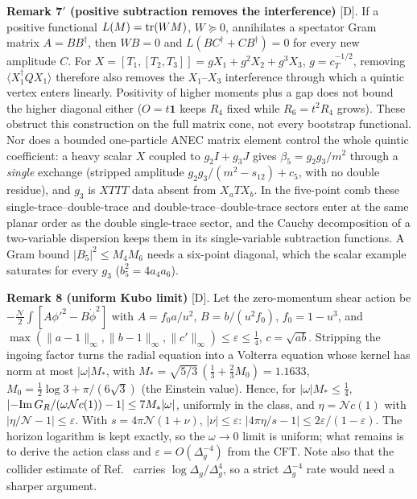 \textbf{Remark 7$'$ (positive subtraction removes the interference)} [D]. If a positive functional $L(M)={\rm tr}(WM)$, $W\succeq0$, annihilates a
spectator Gram matrix $A=BB^\dagger$, then $WB=0$ and $L(BC^\dagger+CB^\dagger)=0$ for every new amplitude $C$. For $X=[T_1,[T_2,T_3]]=gX_1+g^2X_2+g^3X_3$,
$g=c_T^{-1/2}$, removing $\langle X_1^\dagger QX_1\rangle$ therefore also removes the $X_1$--$X_3$ interference through which a quintic vertex enters linearly.
Positivity of higher moments plus a gap does not bound the higher diagonal either ($O=t\mathbf 1$ keeps $R_4$ fixed while $R_6=t^2R_4$ grows).
These obstruct this construction on the full matrix cone, not every bootstrap functional. Nor does a bounded one-particle ANEC matrix element control the whole quintic coefficient: a heavy scalar $X$ coupled to
$g_2I+g_3J$ gives $\beta_5=g_2g_3/m^2$ through a \emph{single} exchange (stripped amplitude $g_2g_3/(m^2-s_{12})+c_5$, with no double residue), and
$g_3$ is $XTTT$ data absent from $X_aTX_b$. In the five-point comb these single-trace--double-trace and double-trace--double-trace sectors enter at the
same planar order as the double single-trace sector, and the Cauchy decomposition of a two-variable dispersion keeps them in its single-variable
subtraction functions. A Gram bound $|B_5|^2\le M_4M_6$ needs a six-point diagonal, which the scalar example saturates for every $g_3$
($b_5^2=4a_4a_6$).

\textbf{Remark 8 (uniform Kubo limit)} [D]. Let the zero-momentum shear action be $-\tfrac{\mathcal N}2\int[A\phi'^2-B\dot\phi^2]$ with
$A=f_0a/u^2$, $B=b/(u^2f_0)$, $f_0=1-u^3$, and $\max(\|a-1\|_\infty,\|b-1\|_\infty,\|c'\|_\infty)\le\varepsilon\le\tfrac14$, $c=\sqrt{ab}$. Stripping
the ingoing factor turns the radial equation into a Volterra equation whose kernel has norm at most $|\omega|M_*$, with
$M_*=\sqrt{5/3}\,(\tfrac13+\tfrac23M_0)=1.1633$, $M_0=\tfrac12\log3+\pi/(6\sqrt3)$ (the Einstein value). Hence, for $|\omega|M_*\le\tfrac14$,
$|{-{\rm Im}\,G_R}/(\omega\mathcal Nc(1))-1|\le7M_*|\omega|$, uniformly in the class, and $\eta=\mathcal Nc(1)$ with $|\eta/\mathcal N-1|\le\varepsilon$.
With $s=4\pi\mathcal N(1+\nu)$, $|\nu|\le\varepsilon$: $|4\pi\eta/s-1|\le2\varepsilon/(1-\varepsilon)$. The horizon logarithm is kept exactly, so the
$\omega\to0$ limit is uniform; what remains is to derive the action class and $\varepsilon=O(\Delta_g^{-4})$ from the CFT. Note also that the
collider estimate of Ref.~\cite{AKT} carries $\log\Delta_g/\Delta_g^4$, so a strict $\Delta_g^{-4}$ rate would need a sharper argument.


